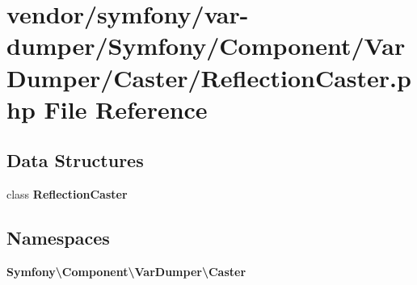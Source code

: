 \section{vendor/symfony/var-\/dumper/\+Symfony/\+Component/\+Var\+Dumper/\+Caster/\+Reflection\+Caster.php File Reference}
\label{_reflection_caster_8php}
\subsection*{Data Structures}
\begin{DoxyCompactItemize}
\item 
class {\bf Reflection\+Caster}
\end{DoxyCompactItemize}
\subsection*{Namespaces}
\begin{DoxyCompactItemize}
\item 
 {\bf Symfony\textbackslash{}\+Component\textbackslash{}\+Var\+Dumper\textbackslash{}\+Caster}
\end{DoxyCompactItemize}
